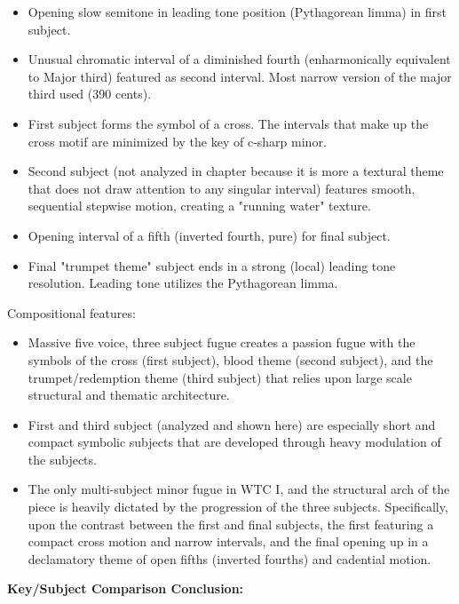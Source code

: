\begin{itemize}
\tightlist
\item
  Opening slow semitone in leading tone position (Pythagorean limma) in
  first subject.
\item
  Unusual chromatic interval of a diminished fourth (enharmonically
  equivalent to Major third) featured as second interval. Most narrow
  version of the major third used (390 cents).
\item
  First subject forms the symbol of a cross. The intervals that make up
  the cross motif are minimized by the key of c-sharp minor.
\item
  Second subject (not analyzed in chapter because it is more a textural
  theme that does not draw attention to any singular interval) features
  smooth, sequential stepwise motion, creating a "running water"
  texture.
\item
  Opening interval of a fifth (inverted fourth, pure) for final subject.
\item
  Final "trumpet theme" subject ends in a strong (local) leading tone
  resolution. Leading tone utilizes the Pythagorean limma.
\end{itemize}

Compositional features:

\begin{itemize}
\tightlist
\item
  Massive five voice, three subject fugue creates a passion fugue with
  the symbols of the cross (first subject), blood theme (second
  subject), and the trumpet/redemption theme (third subject) that relies
  upon large scale structural and thematic architecture.
\item
  First and third subject (analyzed and shown here) are especially short
  and compact symbolic subjects that are developed through heavy
  modulation of the subjects.
\item
  The only multi-subject minor fugue in WTC I, and the structural arch
  of the piece is heavily dictated by the progression of the three
  subjects. Specifically, upon the contrast between the first and final
  subjects, the first featuring a compact cross motion and narrow
  intervals, and the final opening up in a declamatory theme of open
  fifths (inverted fourths) and cadential motion.
\end{itemize}

\textbf{Key/Subject Comparison Conclusion:}

